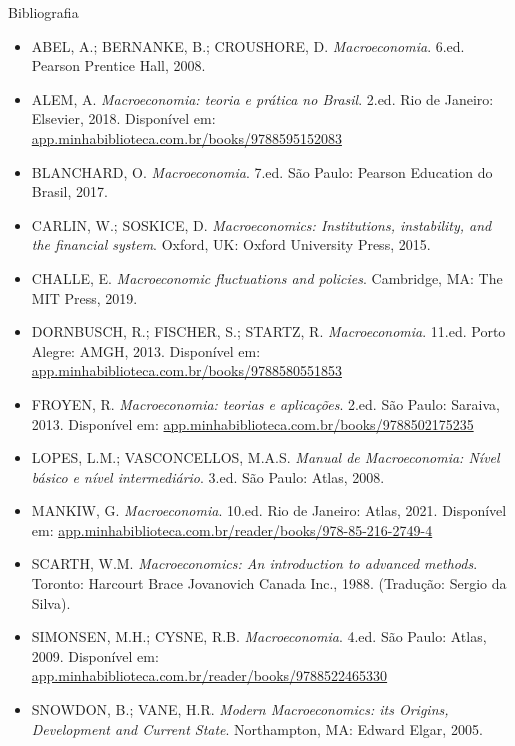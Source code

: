 \documentclass[10pt]{beamer}
\begin{document}
\begin{frame}{Bibliografia}
    \begin{itemize}
        \footnotesize
        \item ABEL, A.; BERNANKE, B.; CROUSHORE, D. \emph{Macroeconomia}. 6.ed. Pearson Prentice Hall, 2008.
        \item ALEM, A. \emph{Macroeconomia: teoria e prática no Brasil}. 2.ed. Rio de Janeiro: Elsevier, 2018. Disponível em: \href{https://app.minhabiblioteca.com.br/books/9788595152083}{app.minhabiblioteca.com.br/books/9788595152083}
        \item BLANCHARD, O. \emph{Macroeconomia}. 7.ed. São Paulo: Pearson Education do Brasil, 2017.
        \item CARLIN, W.; SOSKICE, D. \emph{Macroeconomics: Institutions, instability, and the financial system}. Oxford, UK: Oxford University Press, 2015.
        \item CHALLE, E. \emph{Macroeconomic fluctuations and policies}. Cambridge, MA: The MIT Press, 2019.
        \item DORNBUSCH, R.; FISCHER, S.; STARTZ, R. \emph{Macroeconomia}. 11.ed. Porto Alegre: AMGH, 2013. Disponível em: \href{https://app.minhabiblioteca.com.br/books/9788580551853}{app.minhabiblioteca.com.br/books/9788580551853}
        \item FROYEN, R. \emph{Macroeconomia: teorias e aplicações}. 2.ed. São Paulo: Saraiva, 2013. Disponível em: \href{https://app.minhabiblioteca.com.br/books/9788502175235}{app.minhabiblioteca.com.br/books/9788502175235}
        \item LOPES, L.M.; VASCONCELLOS, M.A.S. \emph{Manual de Macroeconomia: Nível básico e nível intermediário}. 3.ed. São Paulo: Atlas, 2008.
        \item MANKIW, G. \emph{Macroeconomia}. 10.ed. Rio de Janeiro: Atlas, 2021. Disponível em: \href{https://app.minhabiblioteca.com.br/reader/books/978-85-216-2749-4/}{app.minhabiblioteca.com.br/reader/books/978-85-216-2749-4}
        \item SCARTH, W.M. \emph{Macroeconomics: An introduction to advanced methods}. Toronto: Harcourt Brace Jovanovich Canada Inc., 1988. (Tradução: Sergio da Silva).
        \item SIMONSEN, M.H.; CYSNE, R.B. \emph{Macroeconomia}. 4.ed. São Paulo: Atlas, 2009. Disponível em: \href{https://app.minhabiblioteca.com.br/reader/books/9788522465330}{app.minhabiblioteca.com.br/reader/books/9788522465330}
        \item SNOWDON, B.; VANE, H.R. \emph{Modern Macroeconomics: its Origins, Development and Current State}. Northampton, MA: Edward Elgar, 2005.
    \end{itemize}
\end{frame}
\end{document}
